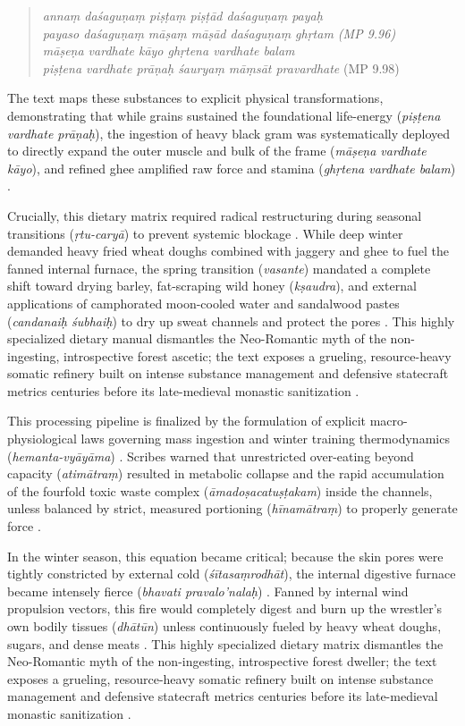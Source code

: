 \documentclass[11pt,twoside,letterpaper]{article}
\begin{document}
\begin{quote}
\textit{annaṃ daśaguṇaṃ piṣṭaṃ piṣṭād daśaguṇaṃ payaḥ \\
payaso daśaguṇaṃ māṣaṃ māṣād daśaguṇaṃ ghṛtam (MP 9.96) \\
māṣeṇa vardhate kāyo ghṛtena vardhate balam  \\
piṣṭena vardhate prāṇaḥ śauryaṃ māṃsāt pravardhate} (MP 9.98)
\end{quote}

The text maps these substances to explicit physical transformations, demonstrating that while grains sustained the foundational life-energy (\textit{piṣṭena vardhate prāṇaḥ}), the ingestion of heavy black gram was systematically deployed to directly expand the outer muscle and bulk of the frame (\textit{māṣeṇa vardhate kāyo}), and refined ghee amplified raw force and stamina (\textit{ghṛtena vardhate balam}) \citep{MP_7}. 

Crucially, this dietary matrix required radical restructuring during seasonal transitions (\textit{ṛtu-caryā}) to prevent systemic blockage \citep{MP_7}. While deep winter demanded heavy fried wheat doughs combined with jaggery and ghee to fuel the fanned internal furnace, the spring transition (\textit{vasante}) mandated a complete shift toward drying barley, fat-scraping wild honey (\textit{kṣaudra}), and external applications of camphorated moon-cooled water and sandalwood pastes (\textit{candanaiḥ śubhaiḥ}) to dry up sweat channels and protect the pores \citep{MP_7}. This highly specialized dietary manual dismantles the Neo-Romantic myth of the non-ingesting, introspective forest ascetic; the text exposes a grueling, resource-heavy somatic refinery built on intense substance management and defensive statecraft metrics centuries before its late-medieval monastic sanitization \citep{MP_7, Wujastyk2025}.

This processing pipeline is finalized by the formulation of explicit macro-physiological laws governing mass ingestion and winter training thermodynamics (\textit{hemanta-vyāyāma}) \citep{MP_7}. Scribes warned that unrestricted over-eating beyond capacity (\textit{atimātraṃ}) resulted in metabolic collapse and the rapid accumulation of the fourfold toxic waste complex (\textit{āmadoṣacatuṣṭakam}) inside the channels, unless balanced by strict, measured portioning (\textit{hīnamātraṃ}) to properly generate force \citep{MP_7}. 

In the winter season, this equation became critical; because the skin pores were tightly constricted by external cold (\textit{śītasaṃrodhāt}), the internal digestive furnace became intensely fierce (\textit{bhavati pravalo’nalaḥ}) \citep{MP_7}. Fanned by internal wind propulsion vectors, this fire would completely digest and burn up the wrestler's own bodily tissues (\textit{dhātūn}) unless continuously fueled by heavy wheat doughs, sugars, and dense meats \citep{MP_7}. This highly specialized dietary matrix dismantles the Neo-Romantic myth of the non-ingesting, introspective forest dweller; the text exposes a grueling, resource-heavy somatic refinery built on intense substance management and defensive statecraft metrics centuries before its late-medieval monastic sanitization \citep{MP_7, Wujastyk2025}.
\end{document}
